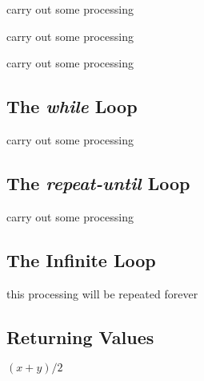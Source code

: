 \documentclass{amsart}
\begin{document}
\begin{algorithmic}[1]
        \STATE carry out some processing 
    \ENDFOR
\end{algorithmic}

\begin{algorithmic}[1]
        \STATE carry out some processing 
    \ENDFOR
\end{algorithmic}

\begin{algorithmic}[1]
        \STATE carry out some processing 
    \ENDFOR
\end{algorithmic}

\subsection{The \emph{while} Loop}

\begin{algorithmic}[1]
        \STATE carry out some processing 
    \ENDWHILE
\end{algorithmic}

\subsection{The \emph{repeat-until} Loop}

\begin{algorithmic}[1]
    \REPEAT[comment]
        \STATE carry out some processing 
\end{algorithmic}

\subsection{The Infinite Loop}

\begin{algorithmic}[1]
    \LOOP[comment]
        \STATE this processing will be repeated forever
    \ENDLOOP
\end{algorithmic}

\subsection{Returning Values}

\begin{algorithmic}[1]
    \RETURN $(x+y)/2$
\end{algorithmic}
\end{document}
